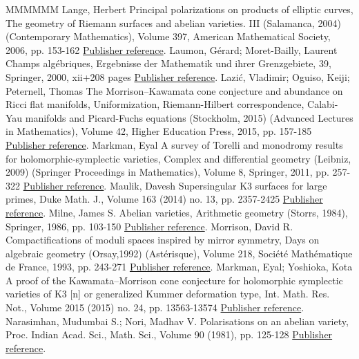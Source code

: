 \documentclass[11pt]{article}
\theoremstyle{definition}
\numberwithin{equation}{section}
\numberwithin{figure}{section}
\numberwithin{table}{section}
\begin{document}
\begin{thebibliography}{MMMMMM}
 Lange, Herbert Principal polarizations on products of elliptic curves, The geometry of Riemann surfaces and abelian varieties. III (Salamanca, 2004) (Contemporary Mathematics), Volume 397, American Mathematical Society, 2006, pp. 153-162 \href{https://ahl.centre-mersenne.org/item/AHL_2018__1__227_0/#La2}{Publisher reference}.
 Laumon, Gérard; Moret-Bailly, Laurent Champs algébriques, Ergebnisse der Mathematik und ihrer Grenzgebiete, 39, Springer, 2000, xii+208 pages \href{https://ahl.centre-mersenne.org/item/AHL_2018__1__227_0/#LM}{Publisher reference}.
 Lazić, Vladimir; Oguiso, Keiji; Peternell, Thomas The Morrison–Kawamata cone conjecture and abundance on Ricci flat manifolds, Uniformization, Riemann-Hilbert correspondence, Calabi-Yau manifolds and Picard-Fuchs equations (Stockholm, 2015) (Advanced Lectures in Mathematics), Volume 42, Higher Education Press, 2015, pp. 157-185 \href{https://ahl.centre-mersenne.org/item/AHL_2018__1__227_0/#LazPet}{Publisher reference}.
 Markman, Eyal A survey of Torelli and monodromy results for holomorphic-symplectic varieties, Complex and differential geometry (Leibniz, 2009) (Springer Proceedings in Mathematics), Volume 8, Springer, 2011, pp. 257-322 \href{https://ahl.centre-mersenne.org/item/AHL_2018__1__227_0/#Mar}{Publisher reference}.
 Maulik, Davesh Supersingular K3 surfaces for large primes, Duke Math. J., Volume 163 (2014) no. 13, pp. 2357-2425 \href{https://ahl.centre-mersenne.org/item/AHL_2018__1__227_0/#Maulik}{Publisher reference}.
 Milne, James S. Abelian varieties, Arithmetic geometry (Storrs, 1984), Springer, 1986, pp. 103-150 \href{https://ahl.centre-mersenne.org/item/AHL_2018__1__227_0/#Milne}{Publisher reference}.
 Morrison, David R. Compactifications of moduli spaces inspired by mirror symmetry, Days on algebraic geometry (Orsay,1992) (Astérisque), Volume 218, Société Mathématique de France, 1993, pp. 243-271 \href{https://ahl.centre-mersenne.org/item/AHL_2018__1__227_0/#Mor}{Publisher reference}.
 Markman, Eyal; Yoshioka, Kota A proof of the Kawamata–Morrison cone conjecture for holomorphic symplectic varieties of K3 [n]  or generalized Kummer deformation type, Int. Math. Res. Not., Volume 2015 (2015) no. 24, pp. 13563-13574 \href{https://ahl.centre-mersenne.org/item/AHL_2018__1__227_0/#MarYos}{Publisher reference}.
 Narasimhan, Mudumbai S.; Nori, Madhav V. Polarisations on an abelian variety, Proc. Indian Acad. Sci., Math. Sci., Volume 90 (1981), pp. 125-128 \href{https://ahl.centre-mersenne.org/item/AHL_2018__1__227_0/#NarNor}{Publisher reference}.

\end{thebibliography}
\end{document}
